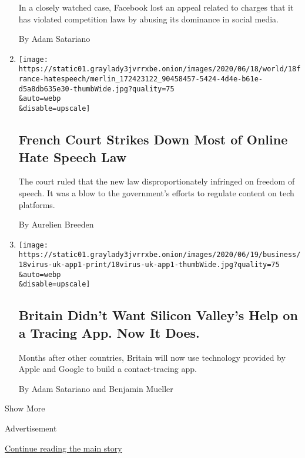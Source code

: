 \begin{enumerate}
  In a closely watched case, Facebook lost an appeal related to charges
  that it has violated competition laws by abusing its dominance in
  social media.

  By Adam Satariano
\item
  \href{/2020/06/18/world/europe/france-internet-hate-speech-regulation.html}{}

  \texttt{[image: https://static01.graylady3jvrrxbe.onion/images/2020/06/18/world/18france-hatespeech/merlin\_172423122\_90458457-5424-4d4e-b61e-d5a8db635e30-thumbWide.jpg?quality=75\\\&auto=webp\\\&disable=upscale]}

  \hypertarget{french-court-strikes-down-most-of-online-hate-speech-law}{%
  \subsection{French Court Strikes Down Most of Online Hate Speech
  Law}\label{french-court-strikes-down-most-of-online-hate-speech-law}}

  The court ruled that the new law disproportionately infringed on
  freedom of speech. It was a blow to the government's efforts to
  regulate content on tech platforms.

  By Aurelien Breeden
\item
  \href{/2020/06/18/business/britain-contact-tracing-app.html}{}

  \texttt{[image: https://static01.graylady3jvrrxbe.onion/images/2020/06/19/business/18virus-uk-app1-print/18virus-uk-app1-thumbWide.jpg?quality=75\\\&auto=webp\\\&disable=upscale]}

  \hypertarget{britain-didnt-want-silicon-valleys-help-on-a-tracing-app-now-it-does}{%
  \subsection{Britain Didn't Want Silicon Valley's Help on a Tracing
  App. Now It
  Does.}\label{britain-didnt-want-silicon-valleys-help-on-a-tracing-app-now-it-does}}

  Months after other countries, Britain will now use technology provided
  by Apple and Google to build a contact-tracing app.

  By Adam Satariano and Benjamin Mueller
\end{enumerate}

Show More

Advertisement

\protect\hyperlink{after-mid2}{Continue reading the main story}

